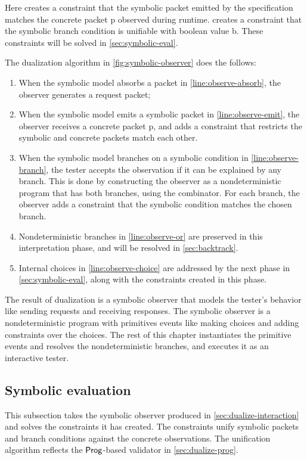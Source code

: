 Here  creates a constraint that the symbolic packet 
emitted by the specification matches the concrete packet \ilc p observed during
runtime.   creates a constraint that the symbolic branch
condition  is unifiable with boolean value \ilc b.  These constraints
will be solved in \autoref{sec:symbolic-eval}.

The dualization algorithm in \autoref{fig:symbolic-observer} does the follows:
\begin{enumerate}
  \item When the symbolic model absorbs a packet in
    \autoref{line:observe-absorb}, the observer generates a request packet;
  \item When the symbolic model emits a symbolic packet  in
    \autoref{line:observe-emit}, the observer receives a concrete packet \ilc p,
    and adds a constraint that restricts the symbolic and concrete packets match
    each other.
  \item When the symbolic model branches on a symbolic condition  in
    \autoref{line:observe-branch}, the tester accepts the observation if it can
    be explained by any branch.  This is done by constructing the observer as a
    nondeterministic program that has both branches, using the 
    combinator.  For each branch, the observer adds a constraint that the
    symbolic condition matches the chosen branch.
  \item Nondeterministic branches in \autoref{line:observe-or} are preserved in
    this interpretation phase, and will be resolved in \autoref{sec:backtrack}.
  \item Internal choices in \autoref{line:observe-choice} are addressed by the
    next phase in \autoref{sec:symbolic-eval}, along with the constraints
    created in this phase.
\end{enumerate}

The result of dualization is a symbolic observer that models the tester's
behavior like sending requests and receiving responses.  The symbolic observer
is a nondeterministic program with primitives events like making choices and
adding constraints over the choices.  The rest of this chapter instantiates the
primitive events and resolves the nondeterministic branches, and executes it as
an interactive tester.

\subsection{Symbolic evaluation}
\label{sec:symbolic-eval}
This subsection takes the symbolic observer produced in
\autoref{sec:dualize-interaction} and solves the constraints it has created.
The constraints unify symbolic packets and branch conditions against the
concrete observations.  The unification algorithm reflects the $\mathsf{Prog}$-based
validator in \autoref{sec:dualize-prog}.

